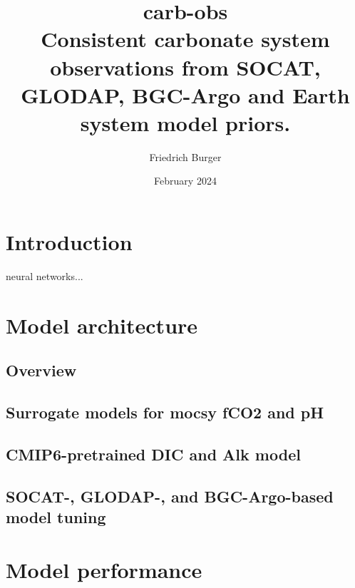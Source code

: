 \documentclass{article}
\title{\textbf{carb-obs} \\
\large Consistent carbonate system observations from SOCAT, GLODAP, BGC-Argo and Earth system model priors.}
\author{Friedrich Burger}
\date {February 2024}
\begin{document}
	
	\maketitle
	\tableofcontents
	\section{Introduction}
	neural networks...\cite{goodfellow2016}
	\section{Model architecture}
	\subsection{Overview}
	\subsection{Surrogate models for mocsy fCO2 and pH}
	\subsection{CMIP6-pretrained DIC and Alk model}
	\subsection{SOCAT-, GLODAP-, and BGC-Argo-based model tuning}
	\section{Model performance}
	\medskip
	
	
	
\end{document}
